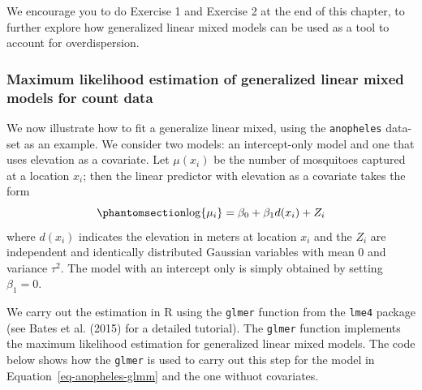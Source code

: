 \documentclass[
  letterpaper,
]{krantz}
\newenvironment{Shaded}{\begin{snugshade}}{\end{snugshade}}
\newcommand{\AttributeTok}[1]{\textcolor[rgb]{0.13,0.29,0.53}{#1}}
\newcommand{\CommentTok}[1]{\textcolor[rgb]{0.56,0.35,0.01}{\textit{#1}}}
\newcommand{\DecValTok}[1]{\textcolor[rgb]{0.00,0.00,0.81}{#1}}
\newcommand{\FunctionTok}[1]{\textcolor[rgb]{0.13,0.29,0.53}{\textbf{#1}}}
\newcommand{\NormalTok}[1]{#1}
\newcommand{\OtherTok}[1]{\textcolor[rgb]{0.56,0.35,0.01}{#1}}
\newcommand{\SpecialCharTok}[1]{\textcolor[rgb]{0.81,0.36,0.00}{\textbf{#1}}}
\begin{document}
We encourage you to do Exercise 1 and Exercise 2 at the end of this
chapter, to further explore how generalized linear mixed models can be
used as a tool to account for overdispersion.

\subsubsection{Maximum likelihood estimation of generalized linear mixed
models for count
data}\label{maximum-likelihood-estimation-of-generalized-linear-mixed-models-for-count-data}

We now illustrate how to fit a generalize linear mixed, using the
\texttt{anopheles} data-set as an example. We consider two models: an
intercept-only model and one that uses elevation as a covariate. Let
\(\mu(x_i)\) be the number of mosquitoes captured at a location \(x_i\);
then the linear predictor with elevation as a covariate takes the form
\begin{equation}\phantomsection\label{eq-anopheles-glmm}{
\log\{\mu_i\} = \beta_{0} + \beta_{1} d(x_i) + Z_i
}\end{equation} where \(d(x_i)\) indicates the elevation in meters at
location \(x_i\) and the \(Z_i\) are independent and identically
distributed Gaussian variables with mean 0 and variance \(\tau^2\). The
model with an intercept only is simply obtained by setting
\(\beta_1 = 0\).

We carry out the estimation in R using the \texttt{glmer} function from
the \texttt{lme4} package (see Bates et al. (2015) for a detailed
tutorial). The \texttt{glmer} function implements the maximum likelihood
estimation for generalized linear mixed models. The code below shows how
the \texttt{glmer} is used to carry out this step for the model in
Equation~\ref{eq-anopheles-glmm} and the one withuot covariates.

\begin{Shaded}
\end{Shaded}
\end{document}
